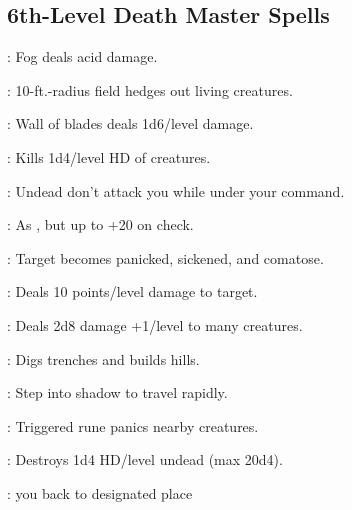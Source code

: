 \begin{multicols}{2}
\subsection{6th-Level Death Master Spells}
\begin{description*}
\item[\linkspell{Acid Fog}:] Fog deals acid damage.
\item[\linkspell{Antilife Shell}:] 10-ft.-radius field hedges out living creatures.
\item[\linkspell{Blade Barrier}:] Wall of blades deals 1d6/level damage.
\item[\linkspell{Circle of Death}:] Kills 1d4/level HD of creatures.
\item[\linkspell{Control Undead}:] Undead don't attack you while under your command.
\item[\linkspell{Dispel Magic, Greater}:] As , but up to +20 on check.
\item[\linkspell{Eyebite}:] Target becomes panicked, sickened, and comatose.
\item[\linkspell{Harm}:] Deals 10 points/level damage to target.
\item[\linkspell{Inflict Moderate Wounds, Mass}:] Deals 2d8 damage +1/level to many creatures.
\item[\linkspell{Move Earth}:] Digs trenches and builds hills.
\item[\linkspell{Shadow Walk}:] Step into shadow to travel rapidly.
\item[\linkspell{Symbol of Fear}:] Triggered rune panics nearby creatures.
\item[\linkspell{Undeath to Death}:] Destroys 1d4 HD/level undead (max 20d4).
\item[\linkspell{Word of Recall}:]  you back to designated place
\end{description*}


\end{multicols}
